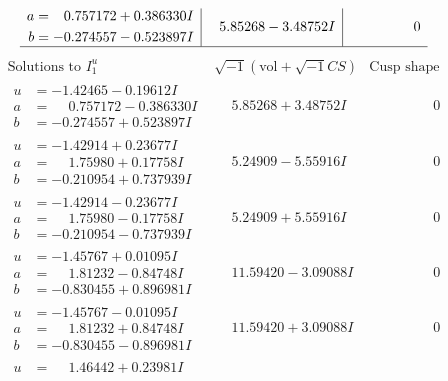 \documentclass[1p]{elsarticle_modified}
\theoremstyle{definition}
\newcommand{\I}{\sqrt{-1}}
\begin{document}
$$\begin{array}{c|c|c}
\begin{aligned}
a &= \phantom{-}0.757172 + 0.386330 I \\
b &= -0.274557 - 0.523897 I\end{aligned}
 & \phantom{-}5.85268 - 3.48752 I & \phantom{-0.000000 } 0\\
 \hline 
 \end{array}$$\newpage$$\begin{array}{c|c|c}  
\text{Solutions to }I^u_{1}& \I (\text{vol} + \sqrt{-1}CS) & \text{Cusp shape}\\
 \hline 
\begin{aligned}
u &= -1.42465 - 0.19612 I \\
a &= \phantom{-}0.757172 - 0.386330 I \\
b &= -0.274557 + 0.523897 I\end{aligned}
 & \phantom{-}5.85268 + 3.48752 I & \phantom{-0.000000 } 0 \\ \hline\begin{aligned}
u &= -1.42914 + 0.23677 I \\
a &= \phantom{-}1.75980 + 0.17758 I \\
b &= -0.210954 + 0.737939 I\end{aligned}
 & \phantom{-}5.24909 - 5.55916 I & \phantom{-0.000000 } 0 \\ \hline\begin{aligned}
u &= -1.42914 - 0.23677 I \\
a &= \phantom{-}1.75980 - 0.17758 I \\
b &= -0.210954 - 0.737939 I\end{aligned}
 & \phantom{-}5.24909 + 5.55916 I & \phantom{-0.000000 } 0 \\ \hline\begin{aligned}
u &= -1.45767 + 0.01095 I \\
a &= \phantom{-}1.81232 - 0.84748 I \\
b &= -0.830455 + 0.896981 I\end{aligned}
 & \phantom{-}11.59420 - 3.09088 I & \phantom{-0.000000 } 0 \\ \hline\begin{aligned}
u &= -1.45767 - 0.01095 I \\
a &= \phantom{-}1.81232 + 0.84748 I \\
b &= -0.830455 - 0.896981 I\end{aligned}
 & \phantom{-}11.59420 + 3.09088 I & \phantom{-0.000000 } 0 \\ \hline\begin{aligned}
u &= \phantom{-}1.46442 + 0.23981 I \\

\end{aligned}
\end{array}$$
\end{document}
